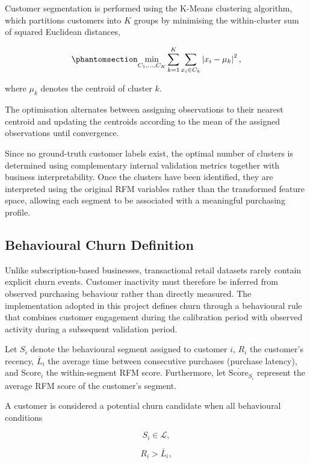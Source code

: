 \documentclass[
  12pt,
  letterpaper,
]{book}
\begin{document}
Customer segmentation is performed using the K-Means clustering
algorithm, which partitions customers into \(K\) groups by minimising
the within-cluster sum of squared Euclidean distances,

\begin{equation}\phantomsection\label{eq-kmeans}{
\min_{C_1,\ldots,C_K}
\sum_{k=1}^{K}
\sum_{x_i\in C_k}
\left|x_i-\mu_k\right|^2,
}\end{equation}

where \(\mu_k\) denotes the centroid of cluster \(k\).

The optimisation alternates between assigning observations to their
nearest centroid and updating the centroids according to the mean of the
assigned observations until convergence.

Since no ground-truth customer labels exist, the optimal number of
clusters is determined using complementary internal validation metrics
together with business interpretability. Once the clusters have been
identified, they are interpreted using the original RFM variables rather
than the transformed feature space, allowing each segment to be
associated with a meaningful purchasing profile.

\subsection{Behavioural Churn
Definition}\label{behavioural-churn-definition}

Unlike subscription-based businesses, transactional retail datasets
rarely contain explicit churn events. Customer inactivity must therefore
be inferred from observed purchasing behaviour rather than directly
measured. The implementation adopted in this project defines churn
through a behavioural rule that combines customer engagement during the
calibration period with observed activity during a subsequent validation
period.

Let \(S_i\) denote the behavioural segment assigned to customer \(i\),
\(R_i\) the customer's recency, \(\bar{L}_i\) the average time between
consecutive purchases (purchase latency), and \(\mathrm{Score}_i\) the
within-segment RFM score. Furthermore, let
\(\overline{\mathrm{Score}}_{S_i}\) represent the average RFM score of
the customer's segment.

A customer is considered a potential churn candidate when all
behavioural conditions

\[
S_i\in\mathcal{L},
\]

\[
R_i>\bar{L}_i,
\]
\end{document}
